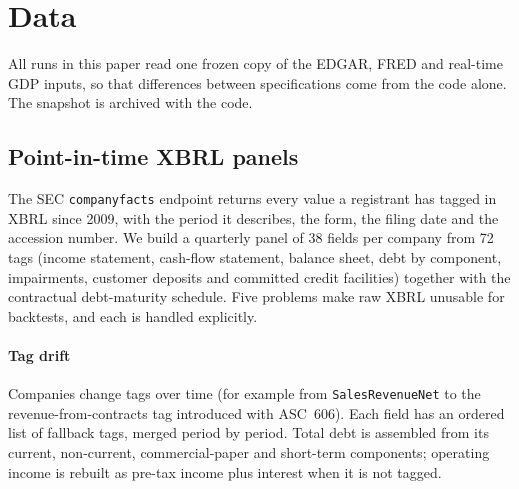 \section{Data}\label{sec:data}

All runs in this paper read one frozen copy of the EDGAR, FRED and real-time GDP inputs, so that differences between specifications come from the code alone. The snapshot is archived with the code.

\subsection{Point-in-time XBRL panels}
The SEC \texttt{companyfacts} endpoint returns every value a registrant has tagged in XBRL since 2009, with the period it describes, the form, the filing date and the accession number. We build a quarterly panel of 38 fields per company from 72 tags (income statement, cash-flow statement, balance sheet, debt by component, impairments, customer deposits and committed credit facilities) together with the contractual debt-maturity schedule. Five problems make raw XBRL unusable for backtests, and each is handled explicitly.

\paragraph{Tag drift} Companies change tags over time (for example from \texttt{SalesRevenueNet} to the revenue-from-contracts tag introduced with ASC~606). Each field has an ordered list of fallback tags, merged period by period. Total debt is assembled from its current, non-current, commercial-paper and short-term components; operating income is rebuilt as pre-tax income plus interest when it is not tagged.

